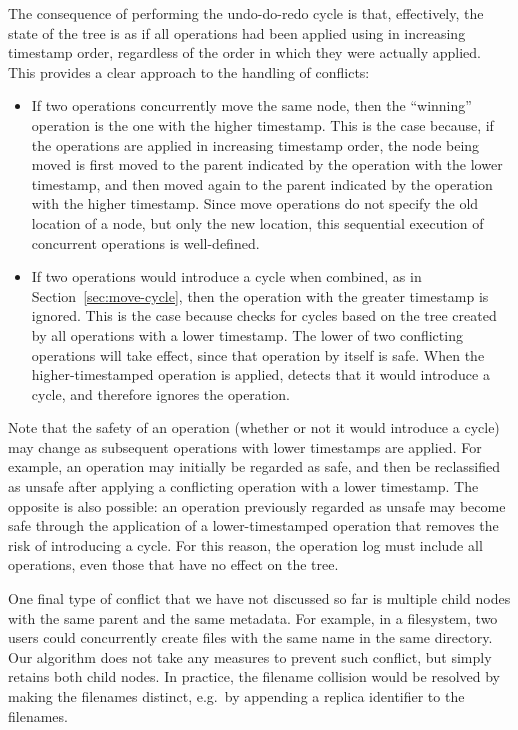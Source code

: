 \documentclass[sigconf]{acmart}
\begin{document}
The consequence of performing the undo-do-redo cycle is that, effectively, the state of the tree is as if all operations had been applied using  in increasing timestamp order, regardless of the order in which they were actually applied.
This provides a clear approach to the handling of conflicts:
\begin{itemize}
    \item If two operations concurrently move the same node, then the ``winning'' operation is the one with the higher timestamp.
        This is the case because, if the operations are applied in increasing timestamp order, the node being moved is first moved to the parent indicated by the operation with the lower timestamp, and then moved again to the parent indicated by the operation with the higher timestamp.
        Since move operations do not specify the old location of a node, but only the new location, this sequential execution of concurrent operations is well-defined.
    \item If two operations would introduce a cycle when combined, as in Section~\ref{sec:move-cycle}, then the operation with the greater timestamp is ignored.
        This is the case because  checks for cycles based on the tree created by all operations with a lower timestamp.
        The lower of two conflicting operations will take effect, since that operation by itself is safe.
        When the higher-timestamped operation is applied,  detects that it would introduce a cycle, and therefore ignores the operation.
\end{itemize}

Note that the safety of an operation (whether or not it would introduce a cycle) may change as subsequent operations with lower timestamps are applied.
For example, an operation may initially be regarded as safe, and then be reclassified as unsafe after applying a conflicting operation with a lower timestamp.
The opposite is also possible: an operation previously regarded as unsafe may become safe through the application of a lower-timestamped operation that removes the risk of introducing a cycle.
For this reason, the operation log must include all operations, even those that have no effect on the tree.

One final type of conflict that we have not discussed so far is multiple child nodes with the same parent and the same metadata.
For example, in a filesystem, two users could concurrently create files with the same name in the same directory.
Our algorithm does not take any measures to prevent such conflict, but simply retains both child nodes.
In practice, the filename collision would be resolved by making the filenames distinct, e.g.\ by appending a replica identifier to the filenames.
\end{document}
